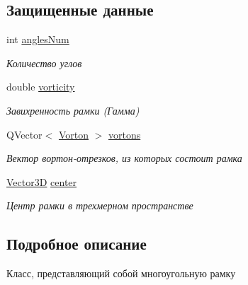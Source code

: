 \subsection*{Защищенные данные}
\begin{DoxyCompactItemize}
\item 
\mbox{\label{class_multi_frame_a45c105d3e683c9743692bc758b51b908}} 
int \mbox{\hyperlink{class_multi_frame_a45c105d3e683c9743692bc758b51b908}{angles\+Num}}
\begin{DoxyCompactList}\small\item\em Количество углов \end{DoxyCompactList}\item 
\mbox{\label{class_multi_frame_a6a8405bde51da4e85db02bf0945a92a1}} 
double \mbox{\hyperlink{class_multi_frame_a6a8405bde51da4e85db02bf0945a92a1}{vorticity}}
\begin{DoxyCompactList}\small\item\em Завихренность рамки (Гамма) \end{DoxyCompactList}\item 
\mbox{\label{class_multi_frame_a188448fa03c5f3cf96cd1f4f3ee9e35f}} 
Q\+Vector$<$ \mbox{\hyperlink{class_vorton}{Vorton}} $>$ \mbox{\hyperlink{class_multi_frame_a188448fa03c5f3cf96cd1f4f3ee9e35f}{vortons}}
\begin{DoxyCompactList}\small\item\em Вектор вортон-\/отрезков, из которых состоит рамка \end{DoxyCompactList}\item 
\mbox{\label{class_multi_frame_a0d42c7c25aa6ad15d9003510c2356e21}} 
\mbox{\hyperlink{class_vector3_d}{Vector3D}} \mbox{\hyperlink{class_multi_frame_a0d42c7c25aa6ad15d9003510c2356e21}{center}}
\begin{DoxyCompactList}\small\item\em Центр рамки в трехмерном пространстве \end{DoxyCompactList}\end{DoxyCompactItemize}


\subsection{Подробное описание}
Класс, представляющий собой многоугольную рамку 


